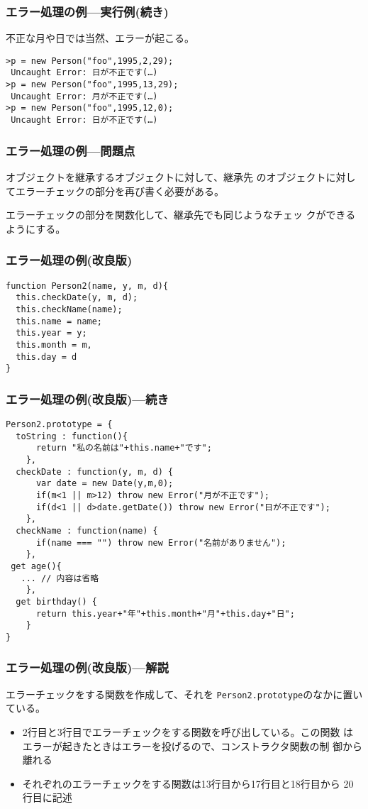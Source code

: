 \begin{frame}[containsverbatim]
 \frametitle{エラー処理の例---実行例(続き)}
 不正な月や日では当然、エラーが起こる。
\begin{Verbatim}
>p = new Person("foo",1995,2,29);
 Uncaught Error: 日が不正です(…)
>p = new Person("foo",1995,13,29);
 Uncaught Error: 月が不正です(…)
>p = new Person("foo",1995,12,0);
 Uncaught Error: 日が不正です(…)
\end{Verbatim}
 \end{frame}
\begin{frame}[containsverbatim]
 \frametitle{エラー処理の例---問題点}
オブジェクトを継承するオブジェクトに対して、継承先
 のオブジェクトに対してエラーチェックの部分を再び書く必要がある。

エラーチェックの部分を関数化して、継承先でも同じようなチェッ
 クができるようにする。
\end{frame}
\begin{frame}[containsverbatim]
 \frametitle{エラー処理の例(改良版)}
\begin{Verbatim}
function Person2(name, y, m, d){
  this.checkDate(y, m, d);
  this.checkName(name);
  this.name = name;
  this.year = y;
  this.month = m,
  this.day = d
}
\end{Verbatim}
 \end{frame}
\begin{frame}[containsverbatim]
 \frametitle{エラー処理の例(改良版)---続き}
{\small
\begin{Verbatim}
Person2.prototype = {
  toString : function(){
      return "私の名前は"+this.name+"です";
    },
  checkDate : function(y, m, d) {
      var date = new Date(y,m,0);
      if(m<1 || m>12) throw new Error("月が不正です");
      if(d<1 || d>date.getDate()) throw new Error("日が不正です");
    },
  checkName : function(name) {
      if(name === "") throw new Error("名前がありません");
    },
 get age(){
   ... // 内容は省略
    },
  get birthday() {
      return this.year+"年"+this.month+"月"+this.day+"日";
    }
}
\end{Verbatim}
 }
 \end{frame}
\begin{frame}[containsverbatim]
 \frametitle{エラー処理の例(改良版)---解説}
エラーチェックをする関数を作成して、それを
 \texttt{Person2.prototype}のなかに置いている。
\begin{itemize}
 \item 2行目と3行目でエラーチェックをする関数を呼び出している。この関数
			 はエラーが起きたときはエラーを投げるので、コンストラクタ関数の制
			 御から離れる
 \item それぞれのエラーチェックをする関数は13行目から17行目と18行目から
			 20行目に記述
\end{itemize}
 \end{frame}

